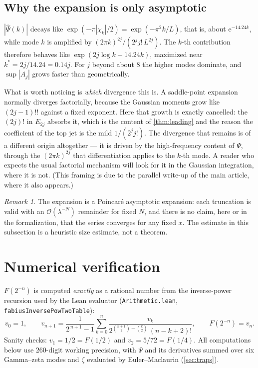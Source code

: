 \documentclass[11pt,oneside]{article}
\theoremstyle{definition}
\theoremstyle{remark}
\newtheorem{remark}[theorem]{Remark}
\newcommand{\e}{\mathrm e}
\newcommand{\bigO}{\mathcal O}
\newcommand{\Psihat}{\widehat\Psi}
\begin{document}
\subsection{Why the expansion is only asymptotic}

$|\Psihat(k)|$ decays like $\exp(-\pi|\chi_k|/2)=\exp(-\pi^2k/L)$, that is,
about $\e^{-14.24k}$, while mode $k$ is amplified by
$(2\pi k)^{2j}/(2^jj!\,L^{2j})$.  The $k$-th contribution therefore behaves like
$\exp(2j\log k-14.24k)$, maximized near $k^\ast=2j/14.24=0.14j$.  For $j$ beyond
about $8$ the higher modes dominate, and $\sup|A_j|$ grows faster than
geometrically.

What is worth noticing is \emph{which} divergence this is.  A saddle-point
expansion normally diverges factorially, because the Gaussian moments grow
like $(2j-1)!!$ against a fixed exponent.  Here that growth is exactly
cancelled: the $(2j)!$ in $E_{2j}$ absorbs it, which is the content of
\cref{thm:leading} and the reason the coefficient of the top jet is the mild
$1/(2^jj!)$.  The divergence that remains is of a different origin
altogether --- it is driven by the high-frequency content of $\Psi$, through
the $(2\pi k)^{2j}$ that differentiation applies to the $k$-th mode.  A
reader who expects the usual factorial mechanism will look for it in the
Gaussian integration, where it is not.  (This framing is due to the parallel
write-up of the main article, where it also appears.)

\begin{remark}
The expansion is a Poincar\'e asymptotic expansion: each truncation is valid
with an $\bigO(\lambda^{-N})$ remainder for fixed $N$, and there is no claim,
here or in the formalization, that the series converges for any fixed $x$.
The estimate in this subsection is a heuristic size estimate, not a theorem.
\end{remark}

\section{Numerical verification}\label{sec:numerics}

$F(2^{-n})$ is computed \emph{exactly} as a rational number from the
inverse-power recursion used by the Lean evaluator
(\nolinkurl{Arithmetic.lean}, \lstinline[style=pseudo]{fabiusInversePowTwoTable}):
\[
  v_0=1,\qquad
  v_{n+1}=\frac{1}{2^{\,n+1}-1}
    \sum_{k=0}^{n}\frac{v_k}{2^{\binom{n+1}{2}-\binom{k}{2}}\,(n-k+2)!},
  \qquad F(2^{-n})=v_n.
\]
Sanity checks: $v_1=1/2=F(1/2)$ and $v_2=5/72=F(1/4)$.  All computations below
use $260$-digit working precision, with $\Psi$ and its derivatives summed over
six Gamma--zeta modes and $\zeta$ evaluated by Euler--Maclaurin
(\cref{sec:traps}).
\end{document}

